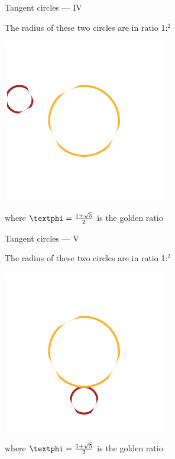 \documentclass[14pt]{beamer}
\begin{document}

    \begin{frame}{Tangent circles --- IV}
        \begin{center}
            The radius of these two circles are in ratio 1:\textphi$^2$
        \end{center}\medskip
        \hspace{6.18em} \includegraphics[scale=1.0]{figures/figure019h.pdf} \\
        \begin{center}
             where $\text{\textphi} =\tfrac{1+\sqrt{5}}{2}$ is the golden ratio
        \end{center}
    \end{frame}


    \begin{frame}{Tangent circles --- V}
        \begin{center}
            The radius of these two circles are in ratio 1:\textphi$^2$
        \end{center}\medskip
        \hspace{6.18em} \includegraphics[scale=1.0]{figures/figure019i.pdf} \\
        \begin{center}
             where $\text{\textphi} =\tfrac{1+\sqrt{5}}{2}$ is the golden ratio
        \end{center}
    \end{frame}
\end{document}
